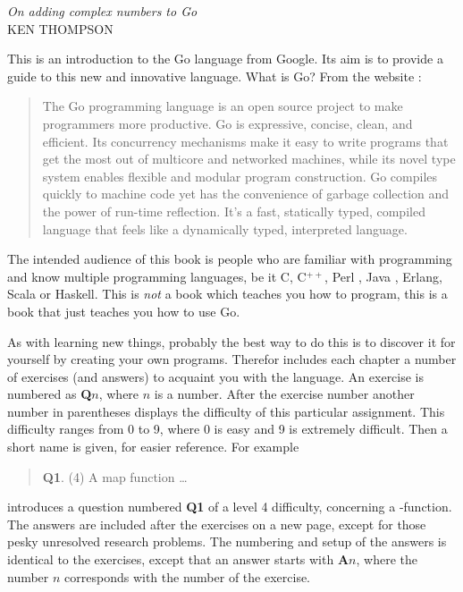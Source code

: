 {\textit{On adding complex numbers to Go}\\ \textsc{KEN THOMPSON}}

\noindent{}This is an introduction to the Go language from Google. Its aim
is to provide a guide to this new and innovative language. What is
Go? From the website \cite{go_web}:
\begin{quote}
The Go programming language is an open source project to make
programmers more productive. Go is expressive, concise, clean, and
efficient. Its concurrency mechanisms make it easy to write programs
that get the most out of multicore and networked machines, while its
novel type system enables flexible and modular program construction. Go
compiles quickly to machine code yet has the convenience of garbage
collection and the power of run-time reflection. It's a fast, statically
typed, compiled language that feels like a dynamically typed,
interpreted language.
\end{quote}

The intended audience of this book is people who are familiar with programming
and know multiple programming languages, be it C\cite{c}, C$^{++}$\cite{c++}, 
Perl \cite{perl}, Java \cite{java}, Erlang\cite{erlang}, Scala\cite{scala} or
Haskell\cite{haskell}. This is \emph{not} a book which teaches you how to 
program, this is a book that just teaches you how to use Go.

As with
learning new things, probably the best way to do this is to discover it for
yourself by creating your own programs.
Therefor includes each chapter a number of exercises (and answers)
to acquaint you with the language.
An exercise
is numbered as \textbf{Q$n$}, where $n$ is a number. After the
exercise number another number in parentheses displays the difficulty
of this particular assignment. This difficulty ranges from 0 to
9, where 0 is easy and 9 is extremely difficult. 
Then a short name is given, for easier reference.
For example
\begin{verse}
\textbf{Q1}. (4) A map function \ldots
\end{verse}
    
introduces a question numbered \textbf{Q1} of a level 4 difficulty, concerning a
-function. The answers are included after the exercises on a
new page, except for those pesky unresolved research problems.
The numbering and setup of the answers is identical to the
exercises, except that an answer starts with \textbf{A$n$}, where the
number $n$ corresponds with the number of the exercise.

